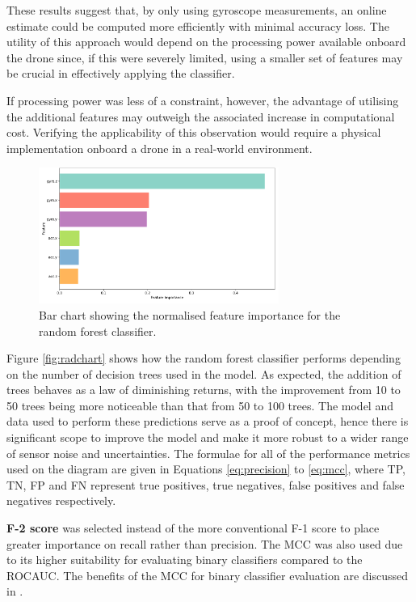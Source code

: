 These results suggest that, by only using gyroscope measurements, an online estimate could be computed more efficiently with minimal accuracy loss. The utility of this approach would depend on the processing power available onboard the drone since, if this were severely limited, using a smaller set of features may be crucial in effectively applying the classifier. 

If processing power was less of a constraint, however, the advantage of utilising the additional features may outweigh the associated increase in computational cost. Verifying the applicability of this observation would require a physical implementation onboard a drone in a real-world environment.

\begin{figure}[H]
\centering
\includegraphics[width=0.70\textwidth]{figs/Samuel/Figures/feature_importance_smote (cropped) (pdfresizer.com).pdf}
\caption{Bar chart showing the normalised feature importance for the random forest classifier.}
\label{fig:featureimportance}
\end{figure}




Figure \ref{fig:radchart} shows how the random forest classifier performs depending on the number of decision trees used in the model. As expected, the addition of trees behaves as a law of diminishing returns, with the improvement from 10 to 50 trees being more noticeable than that from 50 to 100 trees. The model and data used to perform these predictions serve as a proof of concept, hence there is significant scope to improve the model and make it more robust to a wider range of sensor noise and uncertainties. The formulae for all of the performance metrics used on the diagram are given in Equations \ref{eq:precision} to \ref{eq:mcc}, where TP, TN, FP and FN represent true positives, true negatives, false positives and false negatives respectively.

\textbf{F-2 score} was selected instead of the more conventional F-1 score to place greater importance on recall rather than precision. The \gls{MCC} was also used due to its higher suitability for evaluating binary classifiers compared to the \gls{ROCAUC}. The benefits of the \acrshort{MCC} for binary classifier evaluation are discussed in \cite{Chicco2023}.

